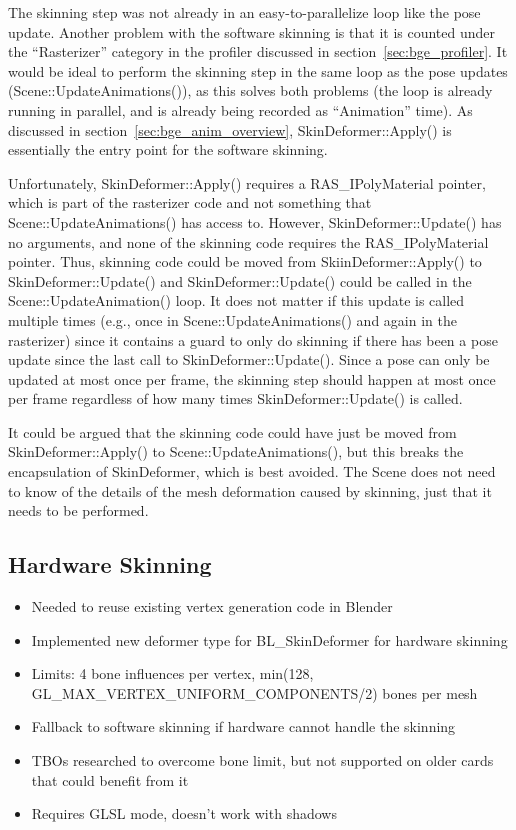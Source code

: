 The skinning step was not already in an easy-to-parallelize loop like the pose update.
Another problem with the software skinning is that it is counted under the ``Rasterizer'' category in the profiler discussed in section~\ref{sec:bge_profiler}.
It would be ideal to perform the skinning step in the same loop as the pose updates (Scene::UpdateAnimations()), as this solves both problems (the loop is already running in parallel, and is already being recorded as ``Animation'' time).
As discussed in section~\ref{sec:bge_anim_overview}, SkinDeformer::Apply() is essentially the entry point for the software skinning.

Unfortunately, SkinDeformer::Apply() requires a RAS\_IPolyMaterial pointer, which is part of the rasterizer code and not something that Scene::UpdateAnimations() has access to.
However, SkinDeformer::Update() has no arguments, and none of the skinning code requires the RAS\_IPolyMaterial pointer.
Thus, skinning code could be moved from SkiinDeformer::Apply() to SkinDeformer::Update() and SkinDeformer::Update() could be called in the Scene::UpdateAnimation() loop.
It does not matter if this update is called multiple times (e.g., once in Scene::UpdateAnimations() and again in the rasterizer) since it contains a guard to only do skinning if there has been a pose update since the last call to SkinDeformer::Update().
Since a pose can only be updated at most once per frame, the skinning step should happen at most once per frame regardless of how many times SkinDeformer::Update() is called.

It could be argued that the skinning code could have just be moved from SkinDeformer::Apply() to Scene::UpdateAnimations(), but this breaks the encapsulation of SkinDeformer, which is best avoided.
The Scene does not need to know of the details of the mesh deformation caused by skinning, just that it needs to be performed.

\subsection{Hardware Skinning}
\ifsummaries
\begin{itemize}
 \item Needed to reuse existing vertex generation code in Blender
 \item Implemented new deformer type for BL\_SkinDeformer for hardware skinning
 \item Limits: 4 bone influences per vertex, min(128, GL\_MAX\_VERTEX\_UNIFORM\_COMPONENTS/2) bones per mesh
 \item Fallback to software skinning if hardware cannot handle the skinning
 \item TBOs researched to overcome bone limit, but not supported on older cards that could benefit from it
 \item Requires GLSL mode, doesn't work with shadows
\end{itemize}
\fi


